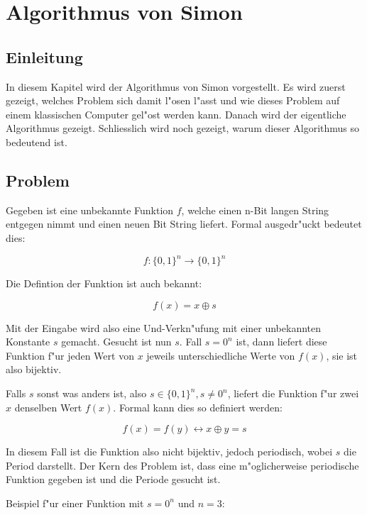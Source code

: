 \chapter{Algorithmus von Simon\label{chapter:simon}} 
\begin{refsection} 

\section{Einleitung} 

In diesem Kapitel wird der Algorithmus von Simon vorgestellt.  Es wird zuerst
gezeigt, welches Problem sich damit l"osen l"asst und wie dieses Problem auf
einem klassischen Computer gel"ost werden kann. Danach wird der eigentliche
Algorithmus gezeigt. Schliesslich wird noch gezeigt, warum dieser Algorithmus so
bedeutend ist.

\section{Problem} 

Gegeben ist eine unbekannte Funktion $f$, welche einen n-Bit langen String
entgegen nimmt und einen neuen Bit String liefert. Formal ausgedr"uckt bedeutet
dies:

\[
    f\colon\{0,1\}^n\to\{0,1\}^n
\]

Die Defintion der Funktion ist auch bekannt:

\[
    f(x) = x \oplus s
\]

Mit der Eingabe wird also eine Und-Verkn"ufung mit einer unbekannten Konstante
$s$ gemacht.  Gesucht ist nun $s$. Fall $s = 0^n$ ist, dann liefert diese
Funktion f"ur jeden Wert von $x$ jeweils unterschiedliche Werte von $f(x)$, sie
ist also bijektiv.

Falls $s$ sonst was anders ist, also $s \in \{0,1\}^n, s \neq 0^n$, liefert die
Funktion f"ur zwei $x$ denselben Wert $f(x)$. Formal kann dies so definiert
werden:

\[ 
    f(x) = f(y) \leftrightarrow x \oplus y = s 
\]

In diesem Fall ist die Funktion also nicht bijektiv, jedoch periodisch, wobei
$s$ die Period darstellt. Der Kern des Problem ist, dass eine m"oglicherweise
periodische Funktion gegeben ist und die Periode gesucht ist.

Beispiel f"ur einer Funktion mit $s = 0^n$ und $n = 3$:


\end{refsection}
